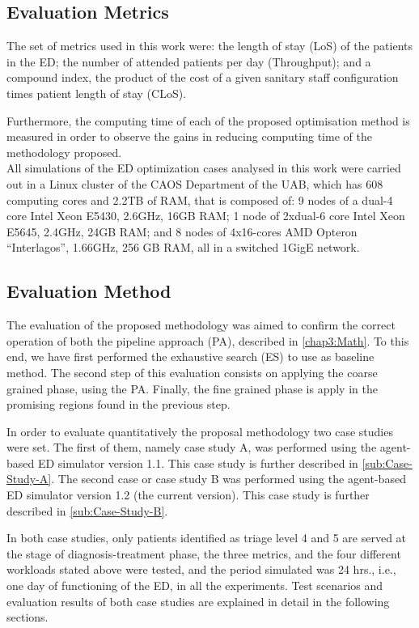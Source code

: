 \documentclass[11pt]{article} %
\begin{document}
\subsection{Evaluation Metrics}
\label{ssec:sabadell4}

The set of metrics used in this work were: the length of stay (LoS)
of the patients in the ED; the number of attended patients per day
(Throughput); and a compound index, the product of the cost of a given
sanitary staff configuration times patient length of stay (CLoS).

Furthermore, the computing time of each of the proposed optimisation
method is measured in order to observe the gains in reducing computing
time of the methodology proposed.\\


All simulations of the ED optimization cases analysed in this work
were carried out in a Linux cluster of the CAOS Department of the
UAB, which has 608 computing cores and 2.2TB of RAM, that is composed
of: 9 nodes of a dual-4 core Intel Xeon E5430, 2.6GHz, 16GB RAM; 1
node of 2xdual-6 core Intel Xeon E5645, 2.4GHz, 24GB RAM; and 8 nodes
of 4x16-cores AMD Opteron ``Interlagos'', 1.66GHz, 256 GB RAM, all
in a switched 1GigE network.

\subsection{Evaluation Method}
\label{ssec:sabadell5}


The evaluation of the proposed methodology was aimed to confirm the
correct operation of both the pipeline approach (PA), described in \ref{chap3:Math}. To this end,
we have first performed the exhaustive search (ES) to use as baseline
method. The second step of this evaluation consists on applying the
coarse grained phase, using the PA. Finally, the fine grained phase is apply in the promising
regions found in the previous step. 

In order to evaluate quantitatively the proposal methodology two case
studies were set. The first of them, namely case study A, was performed
using the agent-based ED simulator version 1.1. This case study is
further described in \ref{sub:Case-Study-A}. The second case or case
study B was performed using the agent-based ED simulator version 1.2
(the current version). This case study is further described in \ref{sub:Case-Study-B}.

In both case studies, only patients identified as triage level 4 and
5 are served at the stage of diagnosis-treatment phase, the three
metrics, and the four different workloads stated above were tested,
and the period simulated was 24 hrs., i.e., one day of functioning
of the ED, in all the experiments. Test scenarios and evaluation results
of both case studies are explained in detail in the following sections.\\
\end{document}
